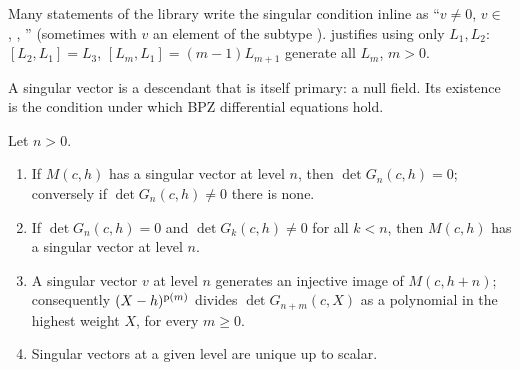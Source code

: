 \begin{dictionary}
Many statements of the library write the singular condition inline as ``$v\ne0$, $v\in$
, , '' (sometimes with $v$
an element of the subtype ). \allowbreak{}\allowbreak{}\allowbreak{}\allowbreak{}\allowbreak{} justifies using
only $L_1,L_2$: $[L_2,L_1] = L_3$, $[L_{m},L_1] = (m-1)L_{m+1}$ generate all $L_m$, $m>0$.
\end{dictionary}

\begin{physics}
A singular vector is a descendant that is itself primary: a null field. Its existence is the condition
under which BPZ differential equations hold.
\end{physics}

\begin{theorem}\label{l06:thm:singgram}
Let $n>0$.
\begin{enumerate}
\item If $M(c,h)$ has a singular vector at level $n$, then $\det G_n(c,h) = 0$; conversely if
  $\det G_n(c,h)\ne0$ there is none.
\item If $\det G_n(c,h) = 0$ and $\det G_k(c,h)\ne0$ for all $k<n$, then $M(c,h)$ has a singular vector at
  level $n$.
\item A singular vector $v$ at level $n$ generates an injective image of $M(c,h+n)$; consequently
  $(X-h)^{\mathrm{p}(m)}$ divides $\det G_{n+m}(c,X)$ as a polynomial in the highest weight $X$, for every
  $m\ge0$.
\item Singular vectors at a given level are unique up to scalar.
\end{enumerate}
\end{theorem}

